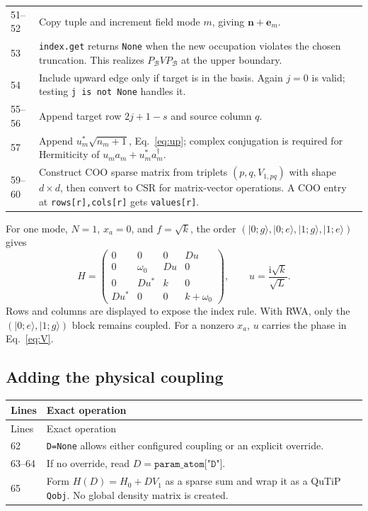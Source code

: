 \documentclass[11pt,a4paper]{article}
\newcommand{\ket}[1]{\lvert #1\rangle}
\newcommand{\code}[1]{\nolinkurl{#1}}
\newcommand{\ii}{\mathrm i}
\begin{document}
\begin{longtable}{p{}p{}}
51--52 & Copy tuple and increment field mode $m$, giving $\mathbf n+\mathbf e_m$.\\
53 & \code{index.get} returns \code{None} when the new occupation violates the chosen truncation. This realizes $P_{\mathcal B}VP_{\mathcal B}$ at the upper boundary.\\
54 & Include upward edge only if target is in the basis. Again $j=0$ is valid; testing \code{j is not None} handles it.\\
55--56 & Append target row $2j+1-s$ and source column $q$.\\
57 & Append $u_m^*\sqrt{n_m+1}$, Eq.~\eqref{eq:up}; complex conjugation is required for Hermiticity of $u_ma_m+u_m^*a_m^\dagger$.\\
59--60 & Construct COO sparse matrix from triplets $(p,q,V_{1,pq})$ with shape $d\times d$, then convert to CSR for matrix-vector operations. A COO entry at \code{rows[r],cols[r]} gets \code{values[r]}.\\
\bottomrule
\end{longtable}
For one mode, $N=1$, $x_a=0$, and $f=\sqrt{k}$, the order
$(\ket{0;g},\ket{0;e},\ket{1;g},\ket{1;e})$ gives
\[
H=\begin{pmatrix}
0&0&0&D u\\
0&\omega_0&D u&0\\
0&D u^*&k&0\\
D u^*&0&0&k+\omega_0
\end{pmatrix},
\qquad u=\frac{\ii\sqrt{k}}{\sqrt L}.
\]
Rows and columns are displayed to expose the index rule. With RWA, only
the $(\ket{0;e},\ket{1;g})$ block remains coupled.
For a nonzero $x_a$, $u$ carries the phase in Eq.~\eqref{eq:V}.

\subsection{Adding the physical coupling}

\begin{longtable}{p{}p{}}
\toprule Lines & Exact operation\\\midrule\endfirsthead
\toprule Lines & Exact operation\\\midrule\endhead
62 & \code{D=None} allows either configured coupling or an explicit override.\\
63--64 & If no override, read $D=\texttt{param\_atom["D"]}$.\\
65 & Form $H(D)=H_0+D V_1$ as a sparse sum and wrap it as a QuTiP \code{Qobj}. No global density matrix is created.\\
\bottomrule
\end{longtable}
\end{document}
